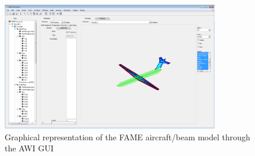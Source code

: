 \begin{enumerate}
\begin{figure}[h!]
\centering
\includegraphics[width = 0.85\textwidth]{FAMEModelFramework}
\caption{Graphical representation of the FAME aircraft/beam model through the AWI GUI}\label{fig:FAMEModelFramework}
\end{figure}

\end{enumerate}

